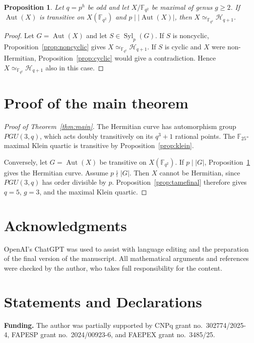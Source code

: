 \documentclass[11pt]{amsart}
\newtheorem{proposition}[theorem]{Proposition}
\theoremstyle{remark}
\newcommand{\F}{\mathbb F}
\newcommand{\Aut}{\operatorname{Aut}}
\newcommand{\Syl}{\operatorname{Syl}}
\newcommand{\cH}{\mathcal H}
\begin{document}
\begin{proposition}\label{prop:wild}
Let $q=p^h$ be odd and let $X/\F_{q^2}$ be maximal of genus
$g\ge2$.  If $\Aut(X)$ is transitive on $X(\F_{q^2})$ and
$p\mid|\Aut(X)|$, then
$X\simeq_{\F_{q^2}}\cH_{q+1}$.
\end{proposition}

\begin{proof}
Let $G=\Aut(X)$ and let $S\in\Syl_p(G)$.  If $S$ is noncyclic,
Proposition~\ref{prop:noncyclic} gives
$X\simeq_{\F_{q^2}}\cH_{q+1}$.  If $S$ is cyclic and $X$ were
non-Hermitian, Proposition~\ref{prop:cyclic} would give a contradiction.
Hence $X\simeq_{\F_{q^2}}\cH_{q+1}$ also in this case.
\end{proof}

\section{Proof of the main theorem}

\begin{proof}[Proof of Theorem~\ref{thm:main}]
The Hermitian curve has automorphism group $PGU(3,q)$, which acts
doubly transitively on its $q^3+1$ rational points.  The $\F_{25}$-maximal Klein quartic is transitive by
Proposition~\ref{prop:klein}.

Conversely, let $G=\Aut(X)$ be transitive on $X(\F_{q^2})$.
If $p\mid|G|$, Proposition~\ref{prop:wild} gives the Hermitian curve.
Assume $p\nmid|G|$.  Then $X$ cannot be Hermitian, since
$PGU(3,q)$ has order divisible by $p$.  Proposition~\ref{prop:tamefinal}
therefore gives $q=5$, $g=3$, and the maximal Klein quartic.
\end{proof}

\section*{Acknowledgments}
OpenAI's ChatGPT was used to assist with language editing and the
preparation of the final version of the manuscript. All mathematical
arguments and references were checked by the author, who takes full
responsibility for the content.

\section*{Statements and Declarations}
\textbf{Funding.}
The author was partially supported by CNPq grant no.~302774/2025-4,
FAPESP grant no.~2024/00923-6, and FAEPEX grant no.~3485/25.
\end{document}
